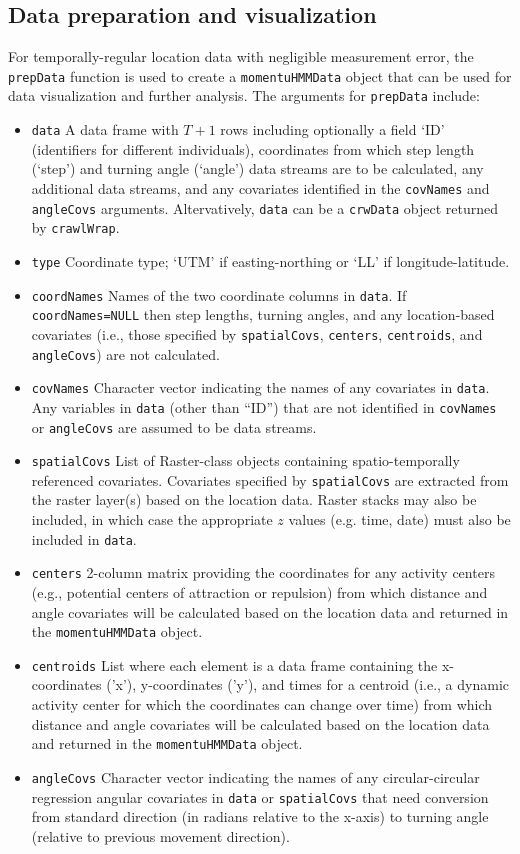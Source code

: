 \documentclass[12pt]{article}\usepackage[]{graphicx}\usepackage[]{xcolor}
\begin{document}
\subsection{Data preparation and visualization}
For temporally-regular location data with negligible measurement error, the \verb|prepData| function is used to create a \verb|momentuHMMData| object that can be used for data visualization and further analysis. The arguments for \verb|prepData| include:
\begin{itemize}
  \item{\verb|data|} A data frame with $T+1$ rows including optionally a field `ID' (identifiers for different individuals), coordinates from which step length (`step') and turning angle (`angle') data streams are to be calculated, any additional data streams, and any covariates identified in the \verb|covNames| and \verb|angleCovs| arguments. Altervatively, \verb|data| can be a \verb|crwData| object returned by \verb|crawlWrap|.
  \item{\verb|type|} Coordinate type; `UTM' if easting-northing or `LL' if longitude-latitude.
  \item{\verb|coordNames|} Names of the two coordinate columns in \verb|data|. If \verb|coordNames=NULL| then step lengths, turning angles, and any location-based covariates (i.e., those specified by \verb|spatialCovs|, \verb|centers|, \verb|centroids|, and \verb|angleCovs|) are not calculated.
  \item{\verb|covNames|} Character vector indicating the names of any covariates in \verb|data|. Any variables in \verb|data| (other than ``ID'') that are not identified in \verb|covNames| or \verb|angleCovs| are assumed to be data streams.
  \item{\verb|spatialCovs|} List of Raster-class objects \citep{Hijmans2016} containing spatio-temporally referenced covariates. Covariates specified by \verb|spatialCovs| are extracted from the raster layer(s) based on the location data. Raster stacks may also be included, in which case the appropriate $z$ values (e.g. time, date) must also be included in \verb|data|.
  \item{\verb|centers|} 2-column matrix providing the coordinates for any activity centers (e.g., potential centers of attraction or repulsion) from which distance and angle covariates will be calculated based on the location data and returned in the \verb|momentuHMMData| object.
  \item{\verb|centroids|} List where each element is a data frame containing the x-coordinates ('x'), y-coordinates ('y'), and times for a centroid (i.e., a dynamic activity center for which the coordinates can change over time) from which distance and angle covariates will be calculated based on the location data and returned in the \verb|momentuHMMData| object.
  \item{\verb|angleCovs|} Character vector indicating the names of any circular-circular regression angular covariates in \verb|data| or \verb|spatialCovs| that need conversion from standard direction (in radians relative to the x-axis) to turning angle (relative to previous movement direction).
\end{itemize}
\end{document}
